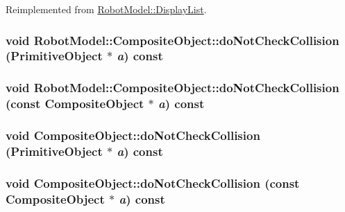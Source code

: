 Reimplemented from \hyperlink{class_robot_model_1_1_display_list_a023ba88eaac38b26dc9ea6a358467637}{RobotModel::DisplayList}.\hypertarget{class_robot_model_1_1_composite_object_a8728705ec34052de6d097fd2b76a6905}{
\subsubsection[{doNotCheckCollision}]{\setlength{\rightskip}{0pt plus 5cm}void RobotModel::CompositeObject::doNotCheckCollision ({\bf PrimitiveObject} $\ast$ {\em a}) const}}
\label{class_robot_model_1_1_composite_object_a8728705ec34052de6d097fd2b76a6905}
\hypertarget{class_robot_model_1_1_composite_object_a7eaa82d589f3698f600a6fee587e2e5c}{
\subsubsection[{doNotCheckCollision}]{\setlength{\rightskip}{0pt plus 5cm}void RobotModel::CompositeObject::doNotCheckCollision (const {\bf CompositeObject} $\ast$ {\em a}) const}}
\label{class_robot_model_1_1_composite_object_a7eaa82d589f3698f600a6fee587e2e5c}
\hypertarget{class_robot_model_1_1_composite_object_a788711732ec5994c3f3a09321e2c5a18}{
\subsubsection[{doNotCheckCollision}]{\setlength{\rightskip}{0pt plus 5cm}void CompositeObject::doNotCheckCollision ({\bf PrimitiveObject} $\ast$ {\em a}) const}}
\label{class_robot_model_1_1_composite_object_a788711732ec5994c3f3a09321e2c5a18}
\hypertarget{class_robot_model_1_1_composite_object_ab6dc53258a7cdb53a22af63688d50ddd}{
\subsubsection[{doNotCheckCollision}]{\setlength{\rightskip}{0pt plus 5cm}void CompositeObject::doNotCheckCollision (const {\bf CompositeObject} $\ast$ {\em a}) const}}
